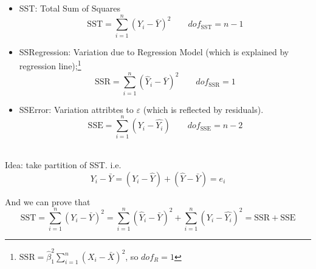 \begin{itemize}[topsep=2pt,itemsep=2pt]
    \item SST: Total Sum of Squares
    \begin{equation}
        \mathrm{SST}=\sum_{i=1}^n(Y_i-\bar{Y})^2 \qquad dof_{\mathrm{SST}}=n-1
    \end{equation}
    \item SSRegression: Variation due to Regression Model  (which is explained by regression line);\footnote{$ \mathrm{SSR}=\hat{\beta }_1^2\sum_{i=1}^n(X_i-\bar{X})^2$, so $ dof_R=1 $}
    \begin{equation}
        \mathrm{SSR}= \sum_{i=1}^n(\hat{Y}_i-\bar{Y})^2 \qquad dof_{\mathrm{SSR}}=1
    \end{equation}
    
    \item SSError: Variation attribtes to $ \varepsilon  $  (which is reflected by residuals).
    \begin{equation}
        \mathrm{SSE}= \sum_{i=1}^n(Y_i-\hat{Y_i}) \qquad dof_{\mathrm{SSE}}=n-2
    \end{equation}
\end{itemize}

\\



    Idea: take partition of SST. i.e.
    \begin{equation}
        Y_i-\bar{Y}=(Y_i-\hat{Y})+(\hat{Y}-\bar{Y})=e_i 
    \end{equation}
    
    And we can prove that
    \begin{equation}
        \mathrm{SST}=\sum_{i=1}^n(Y_i-\bar{Y})^2=\sum_{i=1}^n(\hat{Y}_i-\bar{Y})^2+\sum_{i=1}^n(Y_i-\hat{Y_i})^2=\mathrm{SSR+SSE} 
    \end{equation}

